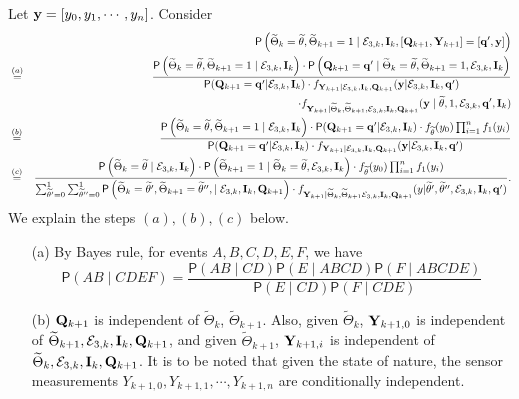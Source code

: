 \documentclass[acmtosn]{acmtrans2m}
\newcommand{\prob}[1]{\mathsf{P}\left(#1\right)}
\newcommand{\nn}{\nonumber \\}
{\theorembodyfont{\rmfamily}
\newtheorem{remarks}{Remark}[section]} \newtheorem{theorem}{Theorem}
\begin{document}
\begin{itemize}
Let ${\bf y} = [y_0,y_1,\cdots,y_n]$. Consider
{\footnotesize
\begin{eqnarray*}
&  & \prob{\widetilde\Theta_k = \widetilde\theta, \widetilde\Theta_{k+1}=1\mid {\mathcal E}_{3,k}, {\bf
I}_{k}, [{\mathbf Q}_{k+1}, {\bf Y}_{k+1}]=[{\bf q}',{\bf y}]}\\ 
& 
\stackrel{(a)}{=} & \frac{ \prob{\widetilde\Theta_k = \widetilde\theta, \widetilde\Theta_{k+1}=1\mid {\mathcal E}_{3,k},  {\bf I}_{k}} \cdot \prob{{\bf Q}_{k+1} = {\bf q}' \mid \widetilde\Theta_k = \widetilde\theta, \widetilde\Theta_{k+1}=1, {\mathcal E}_{3,k},  {\bf I}_{k}}
}{{\mathsf P}({\bf Q}_{k+1}={\bf q}'|{\mathcal E}_{3,k}, {\bf I}_k)
\cdot f_{{\bf Y}_{k+1}\mid {\mathcal E}_{3,k}, {\bf I}_k, {\bf Q}_{k+1}}
({\bf y}|{\mathcal E}_{3,k}, {\bf I}_k,{\bf q}')
 } \nn
& & \cdot
f_{{\bf Y}_{k+1}\mid \widetilde\Theta_k, \widetilde\Theta_{k+1},
{\mathcal E}_{3,k}, {\bf I}_k, {\bf Q}_{k+1} }({\bf y}\mid
\widetilde\theta, 1, {\mathcal E}_{3,k}, {\bf q}', {\bf I}_k )\nn 
& \stackrel{(b)}{=} & \frac{ \prob{\widetilde\Theta_k = \widetilde\theta, \widetilde\Theta_{k+1}=1\mid {\mathcal E}_{3,k}, {\bf I}_{k}} \cdot
{\mathsf P}({\bf Q}_{k+1}={\bf q}'|{\mathcal E}_{3,k}, {\bf I}_k)
\cdot f_{\widetilde\theta}(y_0) \prod_{i=1}^n f_1(y_i)
}{
{\mathsf P}({\bf Q}_{k+1}={\bf q}'|{\mathcal E}_{3,k}, {\bf I}_k)
\cdot   f_{{\bf Y}_{k+1}\mid {\mathcal E}_{3,k}, {\bf I}_k, {\bf Q}_{k+1}}
({\bf y}|{\mathcal E}_{3,k}, {\bf I}_k,{\bf q}')
 } \nn
& \stackrel{(c)}{=} & \frac{ \prob{\widetilde\Theta_k = \widetilde\theta
\mid {\mathcal E}_{3,k}, {\bf I}_{k}} \cdot \prob{\widetilde\Theta_{k+1} = 1
\mid \widetilde\Theta_k = \widetilde\theta, {\mathcal E}_{3,k}, {\bf I}_{k}}  
\cdot f_{\widetilde\theta}(y_0) \prod_{i=1}^n f_1(y_i)}{
\sum_{\widetilde\theta'=0}^1 
\sum_{\widetilde\theta''=0}^1 
\prob{\widetilde\Theta_k= \widetilde\theta', 
\widetilde\Theta_{k+1}= \widetilde\theta'', 
\mid {\mathcal E}_{3,k}, {\bf I}_k, {\bf
Q}_{k+1}}\cdot 
f_{{\bf Y}_{k+1}\mid \widetilde\Theta_k,\widetilde\Theta_{k+1} {\mathcal
E}_{3,k}, {\bf I}_k, {\bf
Q}_{k+1}}(y|\widetilde\theta',\widetilde\theta'',{\mathcal E}_{3,k},
{\bf I}_k,{\bf q}')
}. 
\end{eqnarray*}
}
We explain the steps $(a), (b), (c)$ below.
\begin{itemize}
\item[(a)] By Bayes rule, for events $A,B,C,D,E,F$, we have 
 \[\prob{A B \mid C D E F} = 
           \frac{\prob{A B \mid C D} \prob{E \mid A B C D} \prob{F \mid A
		   B C D E }}{\prob{E\mid C D}\prob{F \mid C D E}}\] 
\item[(b)] ${\bf Q}_{k+1}$ is independent of $\widetilde\Theta_k$, 
$\widetilde\Theta_{k+1}$. Also, given $\widetilde\Theta_k$, 
${\bf Y}_{k+1,0}$ is independent of  $\widetilde\Theta_{k+1},
{\mathcal E}_{3,k}, {\bf I}_k, {\bf Q}_{k+1}$, and 
given $\widetilde\Theta_{k+1}$, 
${\bf Y}_{k+1,i}$ is independent of  $\widetilde\Theta_{k},
{\mathcal E}_{3,k}, {\bf I}_k, {\bf Q}_{k+1}$. It is to be noted that 
given the state of nature, the sensor measurements $Y_{k+1,0},Y_{k+1,1},\cdots,Y_{k+1,n}$
are conditionally independent.


\end{itemize}
\end{itemize}
\end{document}

